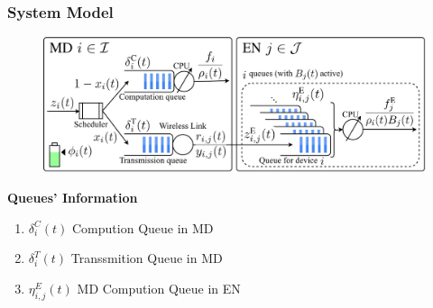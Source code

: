 \begin{frame}
	\frametitle{System Model}
	
	\begin{figure}
		\captionsetup{name=Fig.}
		\centering
		\includegraphics[width=1\linewidth]{queue}
		\vspace*{-5mm}
		\vspace*{-3mm}
		\label{fig1}
	\end{figure}
	
	\vfill
	
	\textbf{Queues' Information}\vspace{2mm}
	
	\begin{enumerate}[$\bullet$]
		
		\item $\delta^C_i(t)$  Compution Queue in MD
		\item $\delta^T_i(t)$  Transsmition Queue in MD
		\item $\eta^E_{i,j}(t)$  MD Compution Queue in EN
		
	\end{enumerate}
	
	
\end{frame}



